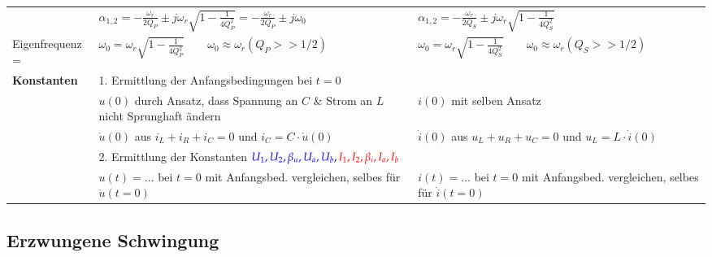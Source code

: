 \begin{tabular}{| p{3.5cm} | p{7.5cm} | p{7cm} |}
		& $\alpha_{1,2} = - \frac{\omega_r}{2 Q_P} \pm j \omega_r \sqrt{1 - \frac{1}{4 Q_P^2}}=-\frac{\omega_r}{2 Q_P} \pm j \omega_0$	
		& $\alpha_{1,2} = - \frac{\omega_r}{2 Q_S} \pm j \omega_r \sqrt{1 - \frac{1}{4 Q_S^2}}$	\\
	\hfill Eigenfrequenz =
		& $\omega_0 = \omega_r \sqrt{1 - \frac{1}{4 Q_P^2}} \qquad \omega_0 \approx \omega_r (Q_P >> 1/2)$ 
		& $\omega_0 = \omega_r \sqrt{1 - \frac{1}{4 Q_S^2}} \qquad \omega_0 \approx\omega_r (Q_S >> 1/2)$\\
		\hline
	\textbf{Konstanten} &
		\multicolumn{2}{l|}{1. Ermittlung der Anfangsbedingungen bei $t = 0$} \\
		& $u(0)$ durch Ansatz, dass Spannung an $C$ \& Strom an $L$ nicht Sprunghaft ändern
		& $i(0)$ mit selben Ansatz\\ 
		& $\dot{u}(0)$ aus $i_L + i_R + i_C = 0$ und $i_C = C\cdot\dot{u}(0)$
		& $\dot{i}(0)$ aus $u_L + u_R + u_C = 0$ und $u_L = L\cdot\dot{i}(0)$\\
		\cline{2-3}
		&\multicolumn{2}{l|}{2. Ermittlung der Konstanten $\textcolor{blue}{U_1,U_2,\beta_u, U_a,U_b},\textcolor{red}{I_1,I_2,\beta_i,I_a,I_b}$ }\\
		& $u(t) = \ldots$ bei $t = 0$ mit Anfangsbed. vergleichen, selbes für $\dot{u}(t=0)$
		& $i(t) = \ldots$ bei $t = 0$ mit Anfangsbed. vergleichen, selbes für $\dot{i}(t=0)$\\
		\hline
	\end{tabular}
	
\renewcommand{\arraystretch}{\arraystretchOriginal}


\subsection{Erzwungene Schwingung}


